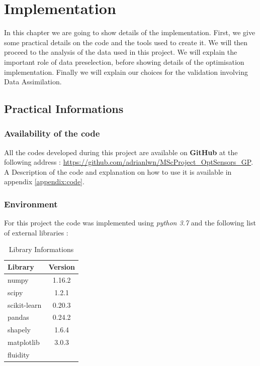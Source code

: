 \chapter{Implementation}


In this chapter we are going to show details of the implementation. First, we give some practical details on the code and the tools used to create it.  We will then proceed to the analysis of the data used in this project. We will explain the important role of data preselection, before showing details of the optimisation implementation. Finally we will explain our choices for the validation involving Data Assimilation. 

\section{Practical Informations}


\subsection{Availability of the code}

All the codes developed during this project are available on \textbf{GitHub} at the following address : \url{https://github.com/adrianlwn/MScProject\_OptSensors\_GP}. A Description of the code and explanation on how to use it is available in appendix \ref{appendix:code}. 


\subsection{Environment}

For this project the code was implemented using \textit{python 3.7} and the following list of external libraries : 

\begin{table}[h!]
\centering
\begin{tabular}{l|c}
\hline
Library & Version \\ \hline
numpy & 1.16.2 \\
scipy & 1.2.1\\
scikit-learn & 0.20.3 \\
pandas & 0.24.2 \\
shapely & 1.6.4 \\
matplotlib & 3.0.3\\ 
fluidity &  \\
\hline

\end{tabular}
\caption{Library Informations}
\end{table}


